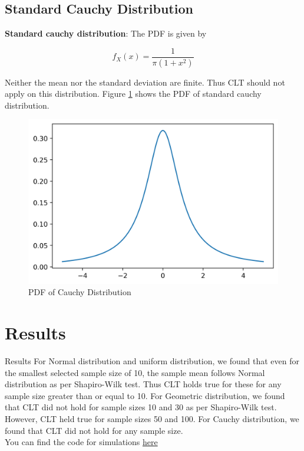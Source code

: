 \documentclass[10pt]{beamer}
\begin{document}
\begin{frame}{}
\subsection{Standard Cauchy Distribution}
\textbf{Standard cauchy distribution}: The PDF is given by
\begin{block}{}
$$f_X(x) = \dfrac{1}{\pi (1+x^2)}$$
\end{block}Neither the mean nor the standard deviation are finite. Thus CLT should not apply on this distribution. Figure \ref{cauchy_pdf} shows the PDF of standard cauchy distribution.
\end{frame}
\begin{frame}{}
    \begin{figure}[H]
        \centering
        \includegraphics[scale=0.4]{images/cauchy.png}
        \caption{PDF of Cauchy Distribution}
        \label{cauchy_pdf}
    \end{figure}
\end{frame}
\section{Results}
\begin{frame}{Results}
    For Normal distribution and uniform distribution, we found that even for the smallest selected sample size of 10, the sample mean follows Normal distribution as per Shapiro-Wilk test. Thus CLT holds true for these for any sample size greater than or equal to 10. For Geometric distribution, we found that CLT did not hold for sample sizes 10 and 30 as per Shapiro-Wilk test. However, CLT held true for sample sizes 50 and 100. For Cauchy distribution, we found that CLT did not hold for any sample size. \\
    You can find the code for simulations \href{https://github.com/cmaspi/verifying_CLT/blob/main/codes/visualise_hist.ipynb}{here}
\end{frame}
\end{document}
